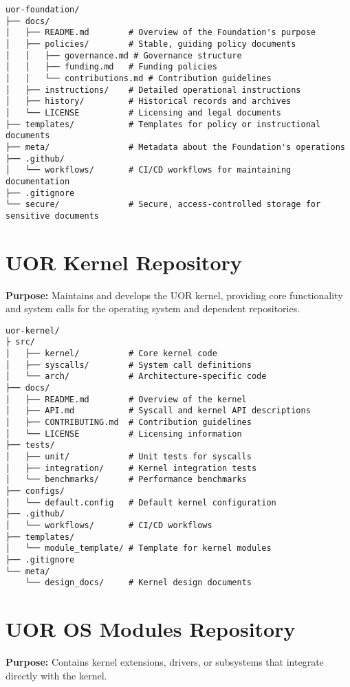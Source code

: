 \documentclass{article}
\begin{document}
\begin{verbatim}
uor-foundation/
├── docs/
│   ├── README.md        # Overview of the Foundation's purpose
│   ├── policies/        # Stable, guiding policy documents
│   │   ├── governance.md # Governance structure
│   │   ├── funding.md   # Funding policies
│   │   └── contributions.md # Contribution guidelines
│   ├── instructions/    # Detailed operational instructions
│   ├── history/         # Historical records and archives
│   └── LICENSE          # Licensing and legal documents
├── templates/           # Templates for policy or instructional documents
├── meta/                # Metadata about the Foundation's operations
├── .github/
│   └── workflows/       # CI/CD workflows for maintaining documentation
├── .gitignore
└── secure/              # Secure, access-controlled storage for sensitive documents
\end{verbatim}

\section{UOR Kernel Repository}
\textbf{Purpose:} Maintains and develops the UOR kernel, providing core functionality and system calls for the operating system and dependent repositories.

\begin{verbatim}
uor-kernel/
├ src/
│   ├── kernel/          # Core kernel code
│   ├── syscalls/        # System call definitions
│   └── arch/            # Architecture-specific code
├── docs/
│   ├── README.md        # Overview of the kernel
│   ├── API.md           # Syscall and kernel API descriptions
│   ├── CONTRIBUTING.md  # Contribution guidelines
│   └── LICENSE          # Licensing information
├── tests/
│   ├── unit/            # Unit tests for syscalls
│   ├── integration/     # Kernel integration tests
│   └── benchmarks/      # Performance benchmarks
├── configs/
│   └── default.config   # Default kernel configuration
├── .github/
│   └── workflows/       # CI/CD workflows
├── templates/
│   └── module_template/ # Template for kernel modules
├── .gitignore
└── meta/
    └── design_docs/     # Kernel design documents
\end{verbatim}

\section{UOR OS Modules Repository}
\textbf{Purpose:} Contains kernel extensions, drivers, or subsystems that integrate directly with the kernel.
\end{document}
